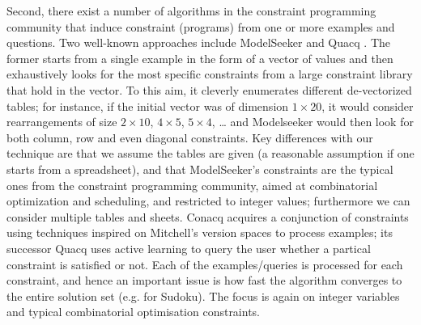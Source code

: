 \documentclass{IEEEtran}
\theoremstyle{definition}
\begin{document}
Second, there exist a number of algorithms in the constraint programming community that induce constraint (programs)
from one or more examples and questions. Two well-known approaches include ModelSeeker \cite{modelseeker} and Quacq \cite{Quacq}.
The former starts from a single example in the form of a vector of values and then exhaustively looks for the most specific constraints from a large constraint library that hold in the vector. To this aim, it cleverly enumerates different de-vectorized tables; for instance, if the initial vector was of dimension $1 \times 20$, it would consider rearrangements of size $2 \times 10$, $4 \times 5$, $5 \times 4$, … and Modelseeker would then look for both column, row  and even diagonal constraints. Key differences with our technique are that we assume the tables are given (a reasonable assumption if one starts from a spreadsheet), and that ModelSeeker's constraints are the typical ones from the constraint programming community, aimed at combinatorial optimization and scheduling, and restricted to integer values; furthermore we can consider multiple tables and sheets. Conacq \cite{Conacq} acquires a conjunction of constraints using techniques inspired on Mitchell's version spaces to process examples; its successor Quacq uses active learning to query the user whether a partical constraint is satisfied or not. Each of the examples/queries is processed for each constraint, and hence an important issue is how fast the algorithm converges to the entire solution set (e.g. for Sudoku).
The focus is again on integer variables and typical combinatorial optimisation constraints.
\end{document}
